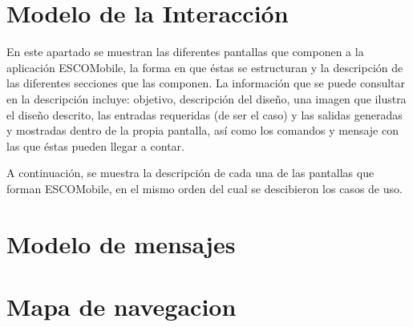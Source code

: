 \documentclass[oneside,10pt]{book}
\begin{document}

\chapter{Modelo de la Interacción}

\noindent
En este apartado se muestran las diferentes pantallas que componen a la aplicación ESCOMobile,
la forma en que éstas se estructuran y la descripción de las diferentes secciones que las componen.
La información que se puede consultar en la descripción incluye: objetivo, descripción del diseño, 
una imagen que ilustra el diseño descrito, las entradas requeridas (de ser el caso) y las salidas
generadas y mostradas dentro de la propia pantalla, así como los comandos y mensaje con las que
éstas pueden llegar a contar.

\noindent
\newline
A continuación, se muestra la descripción de cada una de las pantallas que forman ESCOMobile,
en el mismo orden del cual se descibieron los casos de uso.




\chapter{Modelo de mensajes}


\chapter{Mapa de navegacion}
\end{document}
